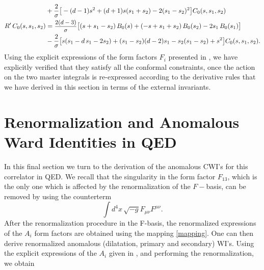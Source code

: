 \documentclass[a4paper,11pt,openright,twoside]{book}
\let\s=\sigma  \let\t=\tau     \let\u=\upsilon \let\f=\phi
\newcommand{\sdfrac}[2]{\mbox{\small$\displaystyle\frac{#1}{#2}$}}
\numberwithin{equation}{section}
\begin{document}
{{\begin{subequations}
\begin{align}
		&+\frac{2}{\s}\big[-(d-1)s^2+(d+1)s(s_1+s_2)-2(s_1-s_2)^2\big]C_0(s,s_1,s_2)\notag\\
		R'\,C_0(s,s_1,s_2)&=\sdfrac{2(d-3)}{\s}\big[(s+s_1-s_2)\,B_0(s)+(-s+s_1+s_2)\,B_0(s_2)-2s_1\,B_0(s_1)\big]\notag\notag\\
		&-\frac{2}{\s}\big[s(s_1-d\,s_1-2s_2)+(s_1-s_2)(d-2)s_1-s_2(s_1-s_2)+s^2\big]C_0(s,s_1,s_2) .
	\end{align}
\end{subequations}
Using the explicit expressions of the form factors $F_i$ presented in \cite{Coriano:2018bbe}, we have explicitly verified that they satisfy all the conformal constraints, once the action on the two master integrals is re-expressed according to the derivative rules that we have derived in this section in terms of the external invariants.

\section{Renormalization and Anomalous Ward Identities in QED }
In this final section we turn to the derivation of the anomalous CWI's for this correlator in QED. We recall that the singularity in the form factor $F_{13}$, which is the only one which is affected by the renormalization of the 
$F-$basis, can be removed by using the counterterm
\begin{equation}
	\int d^4x\,\sqrt{-g} F_{\mu\nu}F^{\mu\nu}.
\end{equation}
After the renormalization procedure in the F-basis, the renormalized expressions of the $A_i$ form factors are obtained using the mapping \eqref{mapping}. One can then derive renormalized anomalous (dilatation, primary and secondary) WI's. Using the explicit expressions of the $A_i$ given in \cite{Coriano:2018bbe}, and performing the renormalization, we obtain

}}
\end{document}
